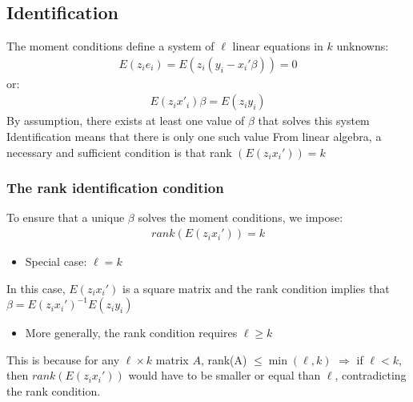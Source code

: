 \documentclass[a4paper,twoside,11pt]{article}
\begin{document}
\subsection{Identification}
The moment conditions define a system of $\ell$ linear equations in $k$ unknowns:
\begin{equation*}
\begin{aligned}
E(z_ie_i)= E(z_i(y_i - x_i'\beta)) = 0
\end{aligned} 
\end{equation*}
or:
\begin{equation*}
\begin{aligned}
E(z_ix'_i)\beta = E(z_iy_i)
\end{aligned} 
\end{equation*}
By assumption, there exists at least one value of $\beta$ that solves this system
\newline
\newline
Identification means that there is only one such value
\newline
From linear algebra, a necessary and sufficient condition is that rank $(E(z_ix_i'))=k$
\subsubsection{The rank identification condition}
To ensure that a unique $\beta$ solves the moment conditions, we impose:
\begin{equation*}
\begin{aligned}
rank(E(z_ix_i'))=k
\end{aligned} 
\end{equation*}
\begin{itemize}
    \item Special case: $\ell=k$
\end{itemize}
In this case, $E(z_ix_i')$ is a square matrix and the rank condition implies that $\beta= E(z_i x_i')^{-1} E(z_iy_i)$
\begin{itemize}
    \item More generally, the rank condition requires $\ell \ge k$
\end{itemize}
This is because for any $\ell \times k$ matrix $A$, rank(A) $\le \min(\ell, k)$
\newline
$\Rightarrow$  if $\ell < k$, then $rank(E(z_ix_i'))$ would have to be smaller or equal than $\ell$, contradicting the rank condition. 
\end{document}
